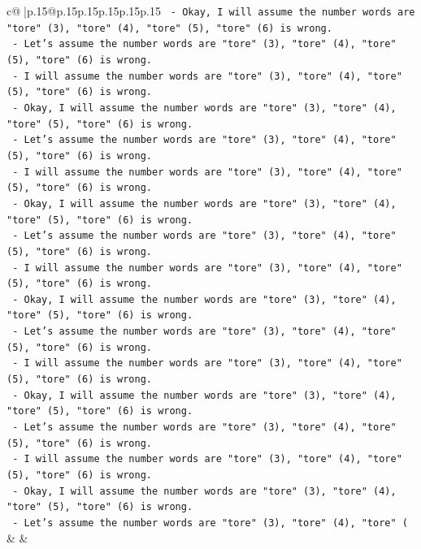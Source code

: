 \documentclass{article}
\begin{document}
{\begin{supertabular}{c@{$\;$}|p{.15\linewidth}@{}p{.15\linewidth}p{.15\linewidth}p{.15\linewidth}p{.15\linewidth}p{.15\linewidth}}
{{{\texttt{  {-} Okay, I will assume the number words are "tore" (3), "tore" (4), "tore" (5), "tore" (6) is wrong.} \\
\texttt{  {-} Let's assume the number words are "tore" (3), "tore" (4), "tore" (5), "tore" (6) is wrong.} \\
\texttt{  {-} I will assume the number words are "tore" (3), "tore" (4), "tore" (5), "tore" (6) is wrong.} \\
\texttt{  {-} Okay, I will assume the number words are "tore" (3), "tore" (4), "tore" (5), "tore" (6) is wrong.} \\
\texttt{  {-} Let's assume the number words are "tore" (3), "tore" (4), "tore" (5), "tore" (6) is wrong.} \\
\texttt{  {-} I will assume the number words are "tore" (3), "tore" (4), "tore" (5), "tore" (6) is wrong.} \\
\texttt{  {-} Okay, I will assume the number words are "tore" (3), "tore" (4), "tore" (5), "tore" (6) is wrong.} \\
\texttt{  {-} Let's assume the number words are "tore" (3), "tore" (4), "tore" (5), "tore" (6) is wrong.} \\
\texttt{  {-} I will assume the number words are "tore" (3), "tore" (4), "tore" (5), "tore" (6) is wrong.} \\
\texttt{  {-} Okay, I will assume the number words are "tore" (3), "tore" (4), "tore" (5), "tore" (6) is wrong.} \\
\texttt{  {-} Let's assume the number words are "tore" (3), "tore" (4), "tore" (5), "tore" (6) is wrong.} \\
\texttt{  {-} I will assume the number words are "tore" (3), "tore" (4), "tore" (5), "tore" (6) is wrong.} \\
\texttt{  {-} Okay, I will assume the number words are "tore" (3), "tore" (4), "tore" (5), "tore" (6) is wrong.} \\
\texttt{  {-} Let's assume the number words are "tore" (3), "tore" (4), "tore" (5), "tore" (6) is wrong.} \\
\texttt{  {-} I will assume the number words are "tore" (3), "tore" (4), "tore" (5), "tore" (6) is wrong.} \\
\texttt{  {-} Okay, I will assume the number words are "tore" (3), "tore" (4), "tore" (5), "tore" (6) is wrong.} \\
\texttt{  {-} Let's assume the number words are "tore" (3), "tore" (4), "tore" (} \\
            }
        }
    }
    & & \\ \\


\end{supertabular}}
\end{document}
